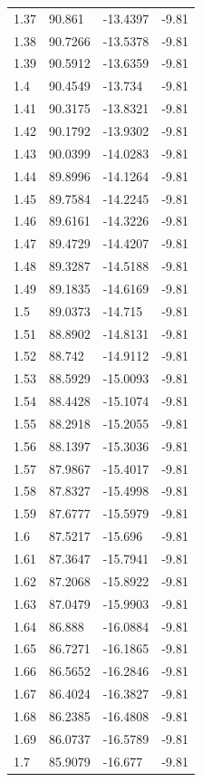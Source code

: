 \begin{tabular}{llll}
1.37 & 90.861 & -13.4397 & -9.81 \\
1.38 & 90.7266 & -13.5378 & -9.81 \\
1.39 & 90.5912 & -13.6359 & -9.81 \\
1.4 & 90.4549 & -13.734 & -9.81 \\
1.41 & 90.3175 & -13.8321 & -9.81 \\
1.42 & 90.1792 & -13.9302 & -9.81 \\
1.43 & 90.0399 & -14.0283 & -9.81 \\
1.44 & 89.8996 & -14.1264 & -9.81 \\
1.45 & 89.7584 & -14.2245 & -9.81 \\
1.46 & 89.6161 & -14.3226 & -9.81 \\
1.47 & 89.4729 & -14.4207 & -9.81 \\
1.48 & 89.3287 & -14.5188 & -9.81 \\
1.49 & 89.1835 & -14.6169 & -9.81 \\
1.5 & 89.0373 & -14.715 & -9.81 \\
1.51 & 88.8902 & -14.8131 & -9.81 \\
1.52 & 88.742 & -14.9112 & -9.81 \\
1.53 & 88.5929 & -15.0093 & -9.81 \\
1.54 & 88.4428 & -15.1074 & -9.81 \\
1.55 & 88.2918 & -15.2055 & -9.81 \\
1.56 & 88.1397 & -15.3036 & -9.81 \\
1.57 & 87.9867 & -15.4017 & -9.81 \\
1.58 & 87.8327 & -15.4998 & -9.81 \\
1.59 & 87.6777 & -15.5979 & -9.81 \\
1.6 & 87.5217 & -15.696 & -9.81 \\
1.61 & 87.3647 & -15.7941 & -9.81 \\
1.62 & 87.2068 & -15.8922 & -9.81 \\
1.63 & 87.0479 & -15.9903 & -9.81 \\
1.64 & 86.888 & -16.0884 & -9.81 \\
1.65 & 86.7271 & -16.1865 & -9.81 \\
1.66 & 86.5652 & -16.2846 & -9.81 \\
1.67 & 86.4024 & -16.3827 & -9.81 \\
1.68 & 86.2385 & -16.4808 & -9.81 \\
1.69 & 86.0737 & -16.5789 & -9.81 \\
1.7 & 85.9079 & -16.677 & -9.81 \\

\end{tabular}
